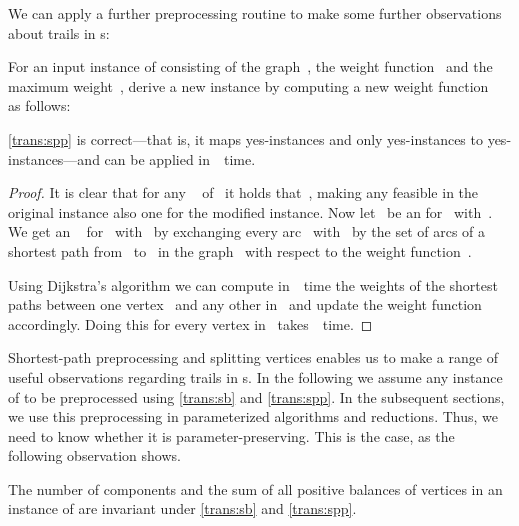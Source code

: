 We can apply a further preprocessing routine to make some further observations about trails in \EE s:
\begin{transformation}
  \label{trans:spp}
  For an input instance of \pWMEEs{} consisting of the graph~, the weight function~ and the maximum weight~, derive a new instance by computing a new weight function~ as follows:
  
\end{transformation}
\begin{lemma}\label{lem:spp}
  \autoref{trans:spp} is correct---that is, it maps yes-instances and only yes-instances to yes-instances---and can be applied in~~time.
\end{lemma}
\begin{proof}
  It is clear that for any \EE{}~ of~ it holds that~, making any feasible \EE{} in the original instance also one for the modified instance. Now let~ be an \EE{} for~ with~. We get an \EE{}~ for~ with~ by exchanging every arc~ with~ by the set of arcs of a shortest path from~ to~ in the graph~ with respect to the weight function~.

Using Dijkstra's algorithm we can compute in~~time the weights of the shortest paths between one vertex~ and any other in~ and update the weight function accordingly. Doing this for every vertex in~ takes~~time.
\end{proof}
Shortest-path preprocessing and splitting vertices enables us to make a range of useful observations regarding trails in \EE s. In the following we assume any instance of \WMEE{} to be preprocessed using \autoref{trans:sb} and \autoref{trans:spp}. In the subsequent sections, we use this preprocessing in parameterized algorithms and reductions. Thus, we need to know whether it is parameter-preserving. This is the case, as the following observation shows. \begin{observation}\label{obs:sbsppinvariants}
  The number of components and the sum of all positive balances of vertices in an instance of \pWMEEs{} are invariant under \autoref{trans:sb} and \autoref{trans:spp}.
\end{observation}

